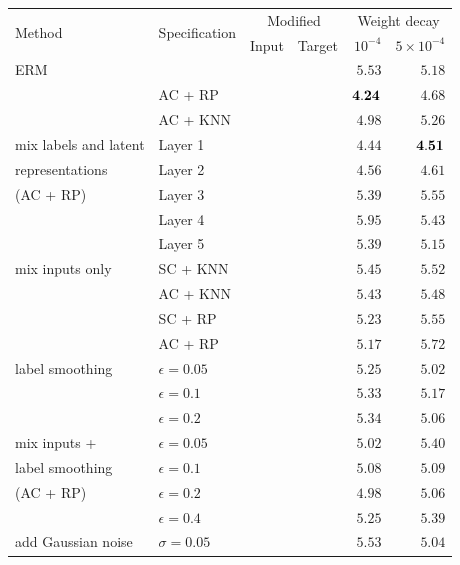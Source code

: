 \begin{table}
	\centering
	\begin{tabular}[b]{ll rr rr}
		\toprule
		\multirow{2}{*}{Method} & \multirow{2}{*}{Specification} & \multicolumn{2}{c}{Modified} & \multicolumn{2}{c}{Weight decay} \\
		\cmidrule(lr){3-4} \cmidrule(lr){5-6}
		\rule{0pt}{2ex} & & Input & Target & $10^{-4}$ & $5\times 10^{-4}$ \\
		\midrule
		ERM & & \xmark & \xmark & $5.53$ & $5.18$ \\
		\midrule
		\mixup{} & AC + RP & \cmark & \cmark &  $\bf 4.24$ & $4.68$ \\
		& AC + KNN & \cmark & \cmark & $4.98$ & $5.26$ \\
		\midrule
		mix labels and latent & Layer 1 & \cmark & \cmark & $4.44$ & $\bf 4.51$ \\
		representations & Layer 2 & \cmark & \cmark & $4.56$ & $4.61$ \\
		(AC + RP) & Layer 3 & \cmark & \cmark & $5.39$ & $5.55$ \\
		& Layer 4 & \cmark & \cmark & $5.95$ & $5.43$ \\
		& Layer 5 & \cmark & \cmark & $5.39$ & $5.15$ \\
		\midrule
		mix inputs only & SC + KNN \citep{chawla2002smote} & \cmark & \xmark & $5.45$ & $5.52$ \\
		& AC + KNN & \cmark & \xmark & $5.43$ & $5.48$ \\
		& SC + RP & \cmark & \xmark & $5.23$ & $5.55$ \\
		& AC + RP & \cmark & \xmark & $5.17$ & $5.72$ \\
		\midrule
		label smoothing & $\epsilon=0.05$ & \xmark & \cmark & $5.25$ & $5.02$ \\
		\citep{szegedy2016rethinking} & $\epsilon=0.1$ & \xmark & \cmark & $5.33$ & $5.17$ \\
		& $\epsilon=0.2$ & \xmark & \cmark & $5.34$ & $5.06$ \\
		\midrule
		mix inputs + & $\epsilon=0.05$ & \cmark & \cmark & $5.02$ & $5.40$ \\
		label smoothing & $\epsilon=0.1$ & \cmark & \cmark & $5.08$ & $5.09$ \\
		(AC + RP) & $\epsilon=0.2$ & \cmark & \cmark & $4.98$ & $5.06$ \\
		& $\epsilon=0.4$ & \cmark & \cmark & $5.25$ & $5.39$ \\
		\midrule
		add Gaussian noise & $\sigma=0.05$ & \cmark & \xmark & $5.53$ & $5.04$ \\

\end{tabular}
\end{table}
